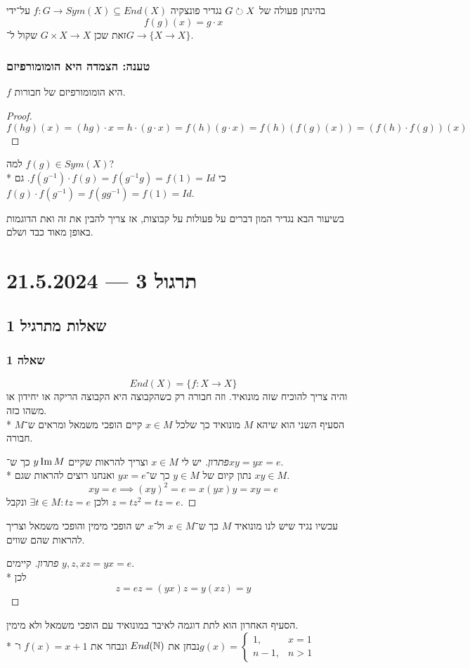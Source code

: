 בהינתן פעולה של $G \circlearrowright X$ נגדיר פונצקיה $f : G \to Sym(X) \subseteq End(X)$ על־ידי
\[
	f(g)(x) = g \cdot x
\]
זאת שכן $G \times X \to X$ שקול ל־$G \to \{ X \to X \}$.

\subsubsection{טענה: הצמדה היא הומומורפיזם}
$f$ היא הומומורפיזם של חבורות.
\begin{proof}
	\[
		f(hg)(x) = (hg) \cdot x = h \cdot (g \cdot x) = f(h)(g \cdot x) = f(h)(f(g)(x)) = (f(h) \cdot f(g))(x)
	\]
\end{proof}

למה $f(g) \in Sym(X)$? \\*
כי $f(g^{-1}) \cdot f(g) = f(g^{-1} g) = f(1) = Id$.
גם $f(g) \cdot f(g^{-1}) = f(g g^{-1}) = f(1) = Id$.

בשיעור הבא נגדיר המון דברים על פעולות על קבוצות, אז צריך להבין את זה ואת הדוגמות באופן מאוד כבד ושלם.

\section{תרגול 3 --- 21.5.2024}
\subsection{שאלות מתרגיל 1}
\subsubsection{שאלה 1}
\[
	End(X) = \{ f : X \to X \}
\]
והיה צריך להוכיח שזה מונואיד. וזה חבורה רק כשהקבוצה היא הקבוצה הריקה או יחידון או משהו כזה. \\*
הסעיף השני הוא שיהא $M$ מונואיד כך שלכל $x \in M$ קיים הופכי משמאל ומראים ש־$M$ חבורה.
\begin{proof}[פתרון]
	יש לי $x \in M$ וצריך להראות שקיים $y \operatorname{Im} M$ כך ש־$xy = yx = e$. \\*
	נתון קיום של $y \in M$ כך ש־$yx = e$ ואנחנו רוצים להראות שגם $xy \in M$.
	\[
		xy = e \implies {(xy)}^2 = e = x (yx) y = xy = e
	\]
	ולכן $\exists t \in M: tz = e$ ונקבל $z = tz^2 = tz = e$.
\end{proof}
עכשיו נגיד שיש לנו מונואיד $M$ כך ש־$x \in M$ ול־$x$ יש הופכי מימין והופכי משמאל וצריך להראות שהם שווים.
\begin{proof}[פתרון]
	קיימים $y, z, xz = yx = e$. \\*
	לכן
	\[
		z = ez = (yx) z = y (xz) = y
	\]
\end{proof}
הסעיף האחרון הוא לתת דוגמה לאיבר במונואיד עם הופכי משמאל ולא מימין. \\*
נבחן את $End(\mathbb{N})$ ונבחר את $f(x) = x + 1$ ו־$g(x) = \begin{cases}
	1, & x = 1 \\
	n - 1, & n > 1
\end{cases}$

